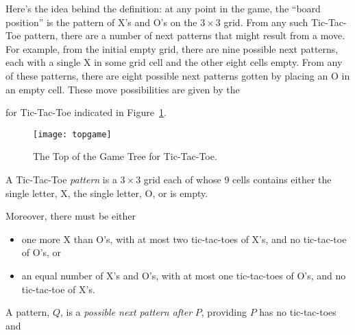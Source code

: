 \begin{definition}
Here's the idea behind the definition: at any point in the game, the
``board position'' is the pattern of X's and O's on the $3 \times 3$
grid.  From any such Tic-Tac-Toe pattern, there are a number of next
patterns that might result from a move.  For example, from the initial
empty grid, there are nine possible next patterns, each with a single
X in some grid cell and the other eight cells empty.  From any of
these patterns, there are eight possible next patterns gotten by
placing an O in an empty cell.  These move possibilities are given by
the
 for Tic-Tac-Toe indicated in
Figure~\ref{fig:Tic-Tac-Toe}.

\begin{figure}
\texttt{[image: topgame]}
\caption{The Top of the Game Tree for Tic-Tac-Toe.}
\label{fig:Tic-Tac-Toe}
\end{figure}


\iffalse
\[\begin{array}{c|c|c}
\hspace{.1in} & \hspace{.1in} & \hspace{.1in}\\
\hline  & &\\
\hline  & &
\end{array}\]

\textbf{FIGURE NEEDED}
\fi

\begin{definition}

A Tic-Tac-Toe \emph{pattern} is a $3 \times 3$ grid each of whose 9 cells
contains either the single letter, X, the single letter, O, or is
empty.
\begin{editingnotes}

Moreover, there must be either
\begin{itemize}

\item one more X than O's, with at most two tic-tac-toes of X's, and no
tic-tac-toe of O's, or

\item an equal number of X's and O's, with at most one tic-tac-toes of
O's, and no tic-tac-toe of X's.
\end{itemize}

\end{editingnotes}

A pattern, $Q$, is a \emph{possible next pattern after} $P$, providing $P$
has no tic-tac-toes and
\begin{itemize}


\end{itemize}
\end{definition}
\end{definition}
